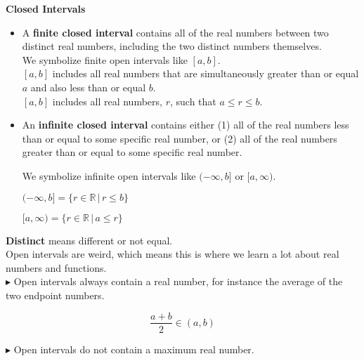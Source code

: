 \documentclass{ximera}
\begin{document}
\begin{definition}  \textbf{\textcolor{green!50!black}{Closed Intervals}} 



\begin{itemize}
\item A \textbf{finite closed interval} contains all of the real numbers between two distinct real numbers, including the two distinct numbers themselves.\\

We symbolize finite open intervals like $[a, b]$. \\
$[a,b]$ includes all real numbers that are simultaneously greater than or equal $a$ and also less than or equal $b$.  \\
$[a,b]$ includes all real numbers, $r$, such that $a \leq r \leq b$.



\item An \textbf{infinite closed interval} contains either (1) all of the real numbers less than or equal to some specific real number, or (2) all of the real numbers greater than or equal to some specific real number.

We symbolize infinite open intervals like $(-\infty, b]$ or $[a, \infty)$.


$(-\infty, b] = \{ r \in \mathbb{R} \, | \,  r \leq b     \}$

$[a, \infty) = \{ r \in \mathbb{R} \, | \,  a \leq r     \}$

\end{itemize}


\end{definition}
\textbf{Distinct} means different or not equal. \\









Open intervals are weird, which means this is where we learn a lot about real numbers and functions. \\


$\blacktriangleright$  Open intervals always contain a real number, for instance the average of the two endpoint numbers.



\[  \frac{a+b}{2}  \in (a,b)    \]





$\blacktriangleright$ Open intervals do not contain a maximum real number.
\end{document}
